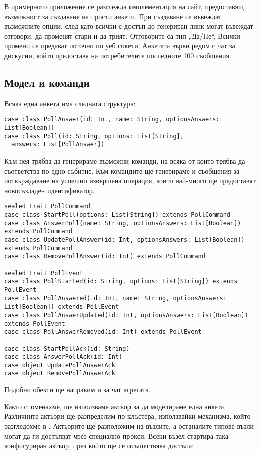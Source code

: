 В примерното приложение се разглежда имплементация на сайт, предоставящ възможност за създаване на прости анкети. При създаване се въвеждат възможните опции, след като всички с достъп до генериран линк могат въвеждат отговори, да променят стари и да трият. Отговорите са тип „Да/Не“. Всички промени се предават поточно по уеб сокети. Анкетата върви редом с чат за дискусии, който предоставя на потребителите последните 100 съобщения.

\subsection{Модел и команди}

Всяка една анкета има следната структура:

\begin{lstlisting}
case class PollAnswer(id: Int, name: String, optionsAnswers: List[Boolean])
case class Poll(id: String, options: List[String],
  answers: List[PollAnswer])
\end{lstlisting}

Към нея трябва да генерираме възможни команди, на всяка от които трябва да съответства по едно събитие. Към командите ще генерираме и съобщения за потвърждаване на успешно извършена операция, които най-много ще предоставят новосъздаден идентификатор.

\begin{lstlisting}
sealed trait PollCommand
case class StartPoll(options: List[String]) extends PollCommand
case class AnswerPoll(name: String, optionsAnswers: List[Boolean]) extends PollCommand
case class UpdatePollAnswer(id: Int, optionsAnswers: List[Boolean]) extends PollCommand
case class RemovePollAnswer(id: Int) extends PollCommand

sealed trait PollEvent
case class PollStarted(id: String, options: List[String]) extends PollEvent
case class PollAnswered(id: Int, name: String, optionsAnswers: List[Boolean]) extends PollEvent
case class PollAnswerUpdated(id: Int, optionsAnswers: List[Boolean]) extends PollEvent
case class PollAnswerRemoved(id: Int) extends PollEvent

case class StartPollAck(id: String)
case class AnswerPollAck(id: Int)
case object UpdatePollAnswerAck
case object RemovePollAnswerAck
\end{lstlisting}

Подобни обекти ще направим и за чат агрегата.

Както споменахме, ще използваме актьор за да моделираме една анкета. Различните актьори ще разпределим по клъстера, използвайки механизма, който разгледохме в . Актьорите ще разположим на  възлите, а останалите типове възли могат да ги достъпват чрез специално прокси. Всеки  възел стартира така конфигуриран актьор, през който ще се осъществява достъпа:

